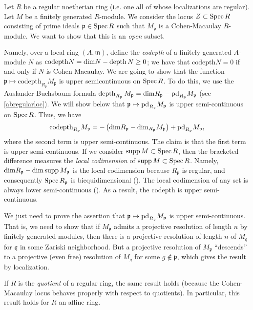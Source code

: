 \begin{example}
Let $R$ be a regular noetherian ring (i.e. one all of whose localizations are
regular). Let $M$ be a finitely generated $R$-module. 
We consider the locus $Z \subset \operatorname{Spec} R$ consisting of prime ideals
$\mathfrak{p} \in \operatorname{Spec} R$ such that $M_{\mathfrak{p}}$ is a Cohen-Macaulay
$R$-module. 
We want to show that this is an \emph{open} subset. 

\newcommand{\codp}{\mathrm{codepth}}
Namely, over a local ring $(A, \mathfrak{m})$, define the \emph{codepth} of a
finitely generated $A$-module $N$ as $\codp N = \dim N - \depth N \geq 0$; we
have that $\codp N = 0$ if and only if $N$ is Cohen-Macaulay.
We are going to show that the function $\mathfrak{p} \mapsto
\codp_{R_{\mathfrak{p}}}
M_{\mathfrak{p}}$ is  upper semicontinuous on $\operatorname{Spec} R$.
To do this, we use  the Auslander-Buchsbaum formula $\operatorname{depth}_{R_{\mathfrak{p}}} M_{\mathfrak{p}} = \mathrm{dim}
R_{\mathfrak{p}} - \mathrm{pd}_{R_{\mathfrak{p}}} M_{\mathfrak{p}}$ (see
\cref{abregularloc}). We will show below
that $\mathfrak{p} \mapsto \mathrm{pd}_{R_{\mathfrak{p}}} M_{\mathfrak{p}}$ is upper
semi-continuous on $\operatorname{Spec} R$. 
Thus, we have
\[ \codp_{R_{\mathfrak{p}}} M_{\mathfrak{p}} =  -\left( \dim R_{\mathfrak{p}} -
\dim_{R_{\mathfrak{p}}} M_{\mathfrak{p}}\right) + \pr_{R_{\mathfrak{p}}}
M_{\mathfrak{p}},   \]
where the second term is upper semi-continuous. 
The claim is that the first term is upper semi-continuous. If we consider
$\operatorname{supp} M \subset \operatorname{Spec} R$, then the bracketed difference measures the
\emph{local codimension} of $\operatorname{supp} M \subset \operatorname{Spec} R$. 
Namely, $\mathrm{dim} R_{\mathfrak{p}} - \mathrm{dim} \operatorname{supp} M_{\mathfrak{p}}$ is the local
codimension because $R_{\mathfrak{p}}$ is regular, and consequently $\operatorname{Spec}
R_{\mathfrak{p}}$ is biequidimensional ().
The local codimension of any set is always lower semi-continuous
(). 
As a result, the codepth is upper semi-continuous. 

We just need to prove the assertion that 
$\mathfrak{p} \mapsto \mathrm{pd}_{R_{\mathfrak{p}}} M_{\mathfrak{p}}$ is upper
semi-continuous. That is, we need to show that if $M_{\mathfrak{p}}$ admits a
projective resolution of length $n$ by finitely generated modules, then there is a projective resolution of
length $n$ of $M_{\mathfrak{q}}$ for $\mathfrak{q}$ in some Zariski
neighborhood. But a projective resolution of $M_{\mathfrak{p}}$ ``descends'' to
a projective (even free) resolution of $M_g$ for some $g \notin \mathfrak{p}$,
which gives the result by localization. 

If $R$ is the \emph{quotient} of a regular ring, the same result holds (because
the Cohen-Macaulay locus behaves properly with respect to quotients). In
particular, this result holds for $R$ an affine ring.
\end{example} 


